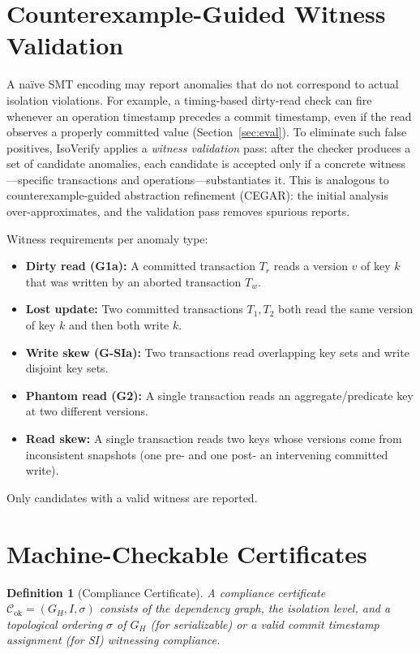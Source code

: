 \documentclass[11pt]{article}
\newtheorem{definition}[theorem]{Definition}
\begin{document}
\section{Counterexample-Guided Witness Validation}
\label{sec:witness}

A na\"ive SMT encoding may report anomalies that do not correspond to actual
isolation violations.  For example, a timing-based dirty-read check can fire
whenever an operation timestamp precedes a commit timestamp, even if the read
observes a properly committed value (Section~\ref{sec:eval}).  To eliminate
such false positives, IsoVerify applies a \emph{witness validation} pass:
after the checker produces a set of candidate anomalies, each candidate is
accepted only if a concrete witness---specific transactions and
operations---substantiates it.  This is analogous to counterexample-guided
abstraction refinement (CEGAR): the initial analysis over-approximates, and
the validation pass removes spurious reports.

Witness requirements per anomaly type:
\begin{itemize}[nosep]
\item \textbf{Dirty read (G1a):}  A committed transaction $T_r$ reads a
  version $v$ of key $k$ that was written by an aborted transaction $T_w$.
\item \textbf{Lost update:}  Two committed transactions $T_1, T_2$ both
  read the same version of key $k$ and then both write $k$.
\item \textbf{Write skew (G-SIa):}  Two transactions read overlapping key
  sets and write disjoint key sets.
\item \textbf{Phantom read (G2):}  A single transaction reads an
  aggregate/predicate key at two different versions.
\item \textbf{Read skew:}  A single transaction reads two keys whose versions
  come from inconsistent snapshots (one pre- and one post- an intervening
  committed write).
\end{itemize}
Only candidates with a valid witness are reported.

\section{Machine-Checkable Certificates}
\label{sec:certs}

\begin{definition}[Compliance Certificate]
A compliance certificate $\mathcal{C}_{\text{ok}} = (G_H, I, \sigma)$
consists of the dependency graph, the isolation level, and a topological
ordering $\sigma$ of $G_H$ (for serializable) or a valid commit timestamp
assignment (for SI) witnessing compliance.
\end{definition}
\end{document}
